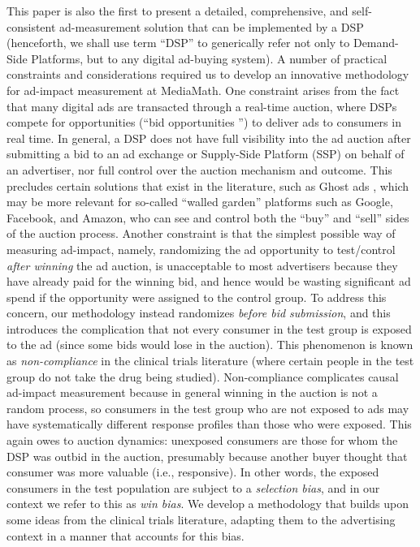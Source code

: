 \documentclass[11pt,a4paper]{article}
\theoremstyle{definition}
\theoremstyle{remark}
\theoremstyle{definition}
\theoremstyle{definition}
\theoremstyle{definition}
\theoremstyle{definition}
\theoremstyle{definition}
\theoremstyle{definition}
\begin{document}
This paper is also the first to present a detailed, comprehensive, and self-consistent ad-measurement solution that can be implemented by a DSP (henceforth, we shall use term “DSP” to generically refer not only to Demand-Side Platforms, but to any digital ad-buying system).
A number of practical constraints and considerations required us to develop an innovative methodology for ad-impact measurement at MediaMath. One constraint arises from the fact that many digital ads are transacted through a real-time auction, where DSPs compete for opportunities (“bid opportunities ”) to deliver ads to consumers in real time. 
In general, a DSP does not have full visibility into the ad auction after submitting a bid to an ad exchange or Supply-Side Platform (SSP) on behalf of an advertiser, nor full control over the auction mechanism and outcome. 
This precludes certain solutions that exist in the literature, such as Ghost ads \cite{Johnson_Ghost_2015}, which may be more relevant for so-called “walled garden” platforms such as Google, Facebook, and Amazon, who can see and control both the “buy” and “sell” sides of the auction process. 
Another constraint is that the simplest possible way of measuring ad-impact, namely, randomizing the ad opportunity to test/control \textit{after winning} the ad auction, is unacceptable to most advertisers because they have already paid for the winning bid, and hence would be wasting significant ad spend if the opportunity were assigned to the control group. 
To address this concern, our methodology instead randomizes \textit{before bid submission}, and this introduces the complication that not every consumer in the test group is exposed to the ad (since some bids would lose in the auction). 
This phenomenon is known as \textit{non-compliance} in the clinical trials literature (where certain people in the test group do not take the drug being studied). 
Non-compliance complicates causal ad-impact measurement because in general winning in the auction is not a random process, so consumers in the test group who are not exposed to ads may have systematically different response profiles than those who were exposed. This again owes to auction dynamics: unexposed consumers are those for whom the DSP was outbid in the auction, presumably because another buyer thought that consumer was more valuable (i.e., responsive). In other words, the exposed consumers in the test population are subject to a \textit{selection bias}, and in our context we refer to this as \textit{win bias}. 
We develop a methodology that builds upon some ideas from the clinical trials literature, adapting them to the advertising context in a manner that accounts for this bias.
\end{document}
